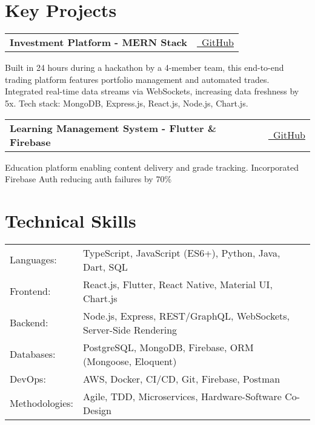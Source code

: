 \documentclass[10pt,a4paper]{article}
\makeatletter
\newcommand{\resumeProject}[3]{
  \vspace{-1pt}
  \begin{tabular*}{\textwidth}[t]{l@{\extracolsep{\fill}}r}
    \textbf{#1} & #2 \\
  \end{tabular*}
  \noindent
  \small{#3}
  \vspace{0.3em}
}
\makeatother
\begin{document}
\vspace{0.1em}

\section{Key Projects}

\resumeProject
{Investment Platform - MERN Stack}
{\href{https://github.com/richiebthomas/FinalSubmissionCodeCrafter}{\faGithub\ GitHub}}
{Built in 24 hours during a hackathon by a 4-member team, this end-to-end trading platform features portfolio management and automated trades. Integrated real-time data streams via WebSockets, increasing data freshness by 5x. Tech stack: MongoDB, Express.js, React.js, Node.js, Chart.js.}

\resumeProject
{Learning Management System - Flutter \& Firebase}
{\href{https://github.com/richiebthomas/flutter_LMS_app}{\faGithub\ GitHub}}
{Education platform enabling content delivery and grade tracking. Incorporated Firebase Auth reducing auth failures by 70\%}

\section{Technical Skills}
\begin{tabular*}{\textwidth}{@{}p{}@{\hspace{0.02\textwidth}}p{}@{}}
Languages: & TypeScript, JavaScript (ES6+), Python, Java, Dart, SQL \\[2pt]
Frontend: & React.js, Flutter, React Native, Material UI, Chart.js \\[2pt]
Backend: & Node.js, Express, REST/GraphQL, WebSockets, Server-Side Rendering \\[2pt]
Databases: & PostgreSQL, MongoDB, Firebase, ORM (Mongoose, Eloquent) \\[2pt]
DevOps: & AWS, Docker, CI/CD, Git, Firebase, Postman \\[2pt]
Methodologies: & Agile, TDD, Microservices, Hardware-Software Co-Design \\
\end{tabular*}
\end{document}
